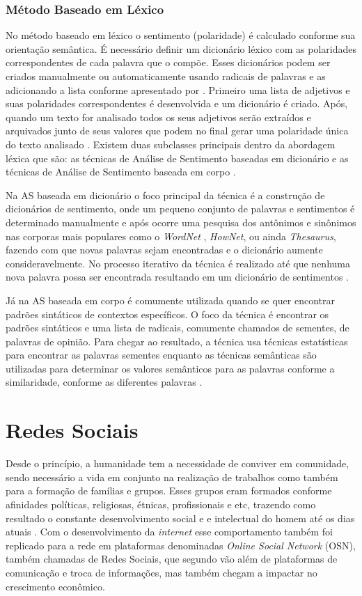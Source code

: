 \subsubsection{Método Baseado em Léxico}
\label{subsubsec:lexico}
No método baseado em léxico o sentimento (polaridade) é calculado conforme sua orientação semântica. É necessário definir um dicionário léxico com as polaridades correspondentes de cada palavra que o compõe. Esses dicionários podem ser criados manualmente ou automaticamente usando radicais de palavras e as adicionando a lista conforme apresentado por . Primeiro uma lista de adjetivos e suas polaridades correspondentes é desenvolvida e um dicionário é criado. Após, quando um texto for analisado todos os seus adjetivos serão extraídos e arquivados junto de seus valores que podem no final gerar uma polaridade única do texto analisado \cite{Taboada}. Existem duas subclasses principais dentro da abordagem léxica que são: as técnicas de Análise de Sentimento baseadas em dicionário e as técnicas de Análise de Sentimento baseada em corpo \cite{LIU2017149}.

Na AS baseada em dicionário o foco principal da técnica é a construção de dicionários de sentimento, onde um pequeno conjunto de palavras e sentimentos é determinado manualmente e após ocorre uma pesquisa dos antônimos e sinônimos nas corporas mais populares como o \textit{WordNet} \cite{Miller:1995:WLD:219717.219748}, \textit{HowNet}, ou ainda \textit{Thesaurus}, fazendo com que novas palavras sejam encontradas e o dicionário aumente consideravelmente. No processo iterativo da técnica é realizado até que nenhuma nova palavra possa ser encontrada resultando em um dicionário de sentimentos \cite{LIU2017149}. 

Já na AS baseada em corpo é comumente utilizada quando se quer encontrar padrões sintáticos de contextos específicos. O foco da técnica é encontrar os padrões sintáticos e uma lista de radicais, comumente chamados de sementes, de palavras de opinião. Para chegar ao resultado, a técnica usa técnicas estatísticas para encontrar as palavras sementes enquanto as técnicas semânticas são utilizadas para determinar os valores semânticos para as palavras conforme a similaridade, conforme as diferentes palavras \cite{LIU2017149}.

\section{Redes Sociais}
\label{sec:RedesSociais}
Desde o princípio, a humanidade tem a necessidade de conviver em comunidade, sendo necessário a vida em conjunto na realização de trabalhos como também para a formação de famílias e grupos. Esses grupos eram formados conforme afinidades políticas, religiosas, étnicas, profissionais e etc, trazendo como resultado o constante desenvolvimento social e e intelectual do homem até os dias atuais \cite{KHALED2018}. Com o desenvolvimento da \textit{internet} esse comportamento também foi replicado para a rede em plataformas denominadas \textit{Online Social Network} (OSN), também chamadas de Redes Sociais, que segundo  vão além de plataformas de comunicação e troca de informações, mas também chegam a impactar no crescimento econômico. 

